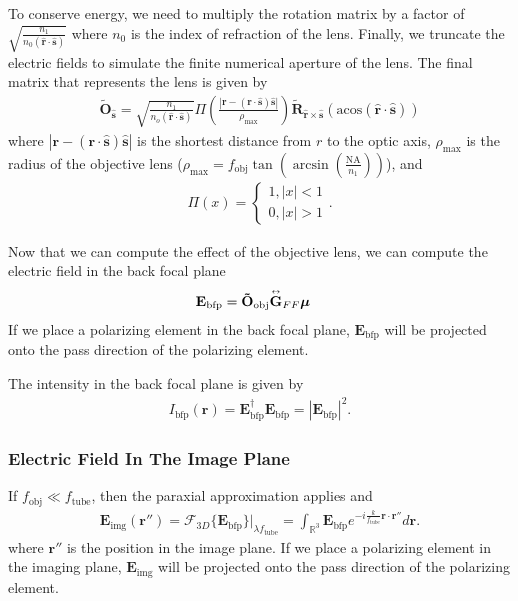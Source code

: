 \documentclass[11pt]{article}
\providecommand{\mb}[1]{\mathbf{#1}}
\providecommand{\mh}[1]{\mathbf{\hat{#1}}}
\providecommand{\bs}[1]{\boldsymbol{#1}}
\newcommand{\tensor}[1]{\overset{\text{\tiny$\leftrightarrow$}}{\mb{#1}}}
\begin{document}
To conserve energy, we need to multiply the rotation matrix by a factor of $\sqrt{\frac{n_1}{n_0(\mh{r}\cdot\mh{s})}}$ \cite{nov} where $n_0$ is the index of refraction of the lens. Finally, we truncate the electric fields to simulate the finite numerical aperture of the lens. The final matrix that represents the lens is given by
\begin{align}
  \mb{\tilde{O}}_{\mh{s}} = \sqrt{\frac{n_1}{n_o(\mh{r}\cdot\mh{s})}}\Pi\left(\frac{|\mb{r} - (\mb{r}\cdot\mh{s})\mh{s}|}{\rho_{\text{max}}}\right)  \tilde{\mb{R}}_{\mh{r}\times\mh{s}}(\text{acos}(\mh{r}\cdot\mh{s}))\label{eq:2}
\end{align}
  where $|\mb{r} - (\mb{r}\cdot\mh{s})\mh{s}|$ is the shortest distance from $r$ to the optic axis, $\rho_{\text{max}}$ is the
  radius of the objective lens
  ($\rho_{\text{max}} =
  f_{\text{obj}}\tan\left(\arcsin\left(\frac{\text{NA}}{n_1}\right)\right)$),
  and
\begin{align}
  \Pi(x) = \begin{cases} 1, |x| < 1\\ 0, |x| > 1\end{cases}.
\end{align}


Now that we can compute the effect of the objective lens, we can compute the
electric field in the back focal plane
\begin{align}
  \mb{E}_{\text{bfp}} &= \mb{\tilde{O}}_{\text{obj}}\tensor{\mathbf{G}}_{FF}\bs{\mu}
  \end{align}
  If we place a polarizing element in the back focal plane, $\mb{E}_{\text{bfp}}$ will
  be projected onto the pass direction of the polarizing element. 

  
The intensity in the back focal plane is given by
\begin{align}
  I_{\text{bfp}}(\mb{r}) = \mb{E}_{\text{bfp}}^{\dag}\mb{E}_{\text{bfp}}
  = |\mb{E}_{\text{bfp}}|^2.
\end{align}

\subsubsection{Electric Field In The Image Plane}
If $f_{\text{obj}} \ll f_{\text{tube}}$, then the paraxial approximation applies
and
\begin{align}
  \mb{E}_{\text{img}}(\mb{r''}) = \mathcal{F}_{3D}\{\mb{E}_{\text{bfp}}\}|_{\lambda f_{\text{tube}}} = \int_{\mathbb{R}^3}\mb{E}_{\text{bfp}}e^{-i\frac{k}{f_{\text{tube}}}\mb{r}\cdot\mb{r''}}d\mb{r}.
\end{align}
where $\mb{r''}$ is the position in the image plane. If we place a polarizing
element in the imaging plane, $\mb{E}_{\text{img}}$ will be projected onto
the pass direction of the polarizing element.
\end{document}

